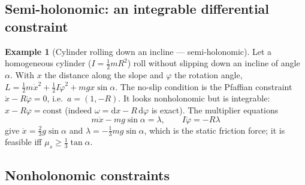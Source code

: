 \documentclass[11pt,a4paper]{article}
\theoremstyle{definition}
\newtheorem{example}{Example}[section]
\theoremstyle{plain}
\theoremstyle{remark}
\newcommand{\dd}{\mathrm{d}}
\begin{document}
\subsection{Semi-holonomic: an integrable differential constraint}

\begin{example}[Cylinder rolling down an incline --- semi-holonomic]\label{ex:cylinder}
Let a homogeneous cylinder ($I=\tfrac12mR^2$) roll without slipping down an incline of angle
$\alpha$. With $x$ the distance along the slope and $\varphi$ the rotation angle,
$L=\tfrac12m\dot x^2+\tfrac12I\dot\varphi^2+mgx\sin\alpha$. The no-slip condition is
the Pfaffian constraint $\dot x-R\dot\varphi=0$, i.e.\ $a=(1,-R)$. It looks
nonholonomic but is integrable: $x-R\varphi=\text{const}$ (indeed $\omega=\dd x-R\,\dd\varphi$
is exact). The multiplier equations
\[
  m\ddot x-mg\sin\alpha=\lambda,\qquad I\ddot\varphi=-R\lambda
\]
give $\ddot x=\tfrac23g\sin\alpha$ and $\lambda=-\tfrac13mg\sin\alpha$, which is the static
friction force; it is feasible iff $\mu_s\ge\tfrac13\tan\alpha$.
\end{example}

\subsection{Nonholonomic constraints}
\end{document}
